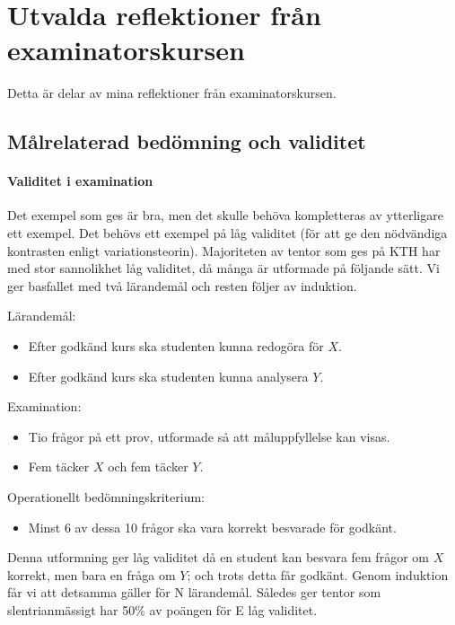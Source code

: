 \section{Utvalda reflektioner från examinatorskursen}%
\label{examinatorskursen}

Detta är delar av mina reflektioner från examinatorskursen.

\subsection{Målrelaterad bedömning och validitet}%
\label{målrelaterad-bedömning-validitet}

\paragraph{Validitet i examination}

Det exempel som ges är bra, men det skulle
behöva kompletteras av ytterligare ett exempel. Det behövs ett exempel
på låg validitet (för att ge den nödvändiga kontrasten enligt
variationsteorin). Majoriteten av tentor som ges på KTH har med stor
sannolikhet låg validitet, då många är utformade på följande sätt. Vi
ger basfallet med två lärandemål och resten följer av induktion.

Lärandemål:
\begin{itemize}
\item
  Efter godkänd kurs ska studenten kunna redogöra för \(X\).
\item
  Efter godkänd kurs ska studenten kunna analysera \(Y\).
\end{itemize}

Examination:
\begin{itemize}
\item
  Tio frågor på ett prov, utformade så att måluppfyllelse kan visas.
\item
  Fem täcker \(X\) och fem täcker \(Y\).
\end{itemize}

Operationellt bedömningskriterium:
\begin{itemize}
\item
  Minst 6 av dessa 10 frågor ska vara korrekt besvarade för godkänt.
\end{itemize}

Denna utformning ger låg validitet då en student kan besvara fem frågor
om \(X\) korrekt, men bara en fråga om \(Y\); och trots detta får godkänt. 
Genom induktion får vi att detsamma gäller för N lärandemål. Således ger
tentor som slentrianmässigt har 50\% av poängen för E låg validitet.

